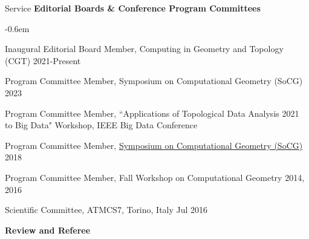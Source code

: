\documentclass{resume} %
\begin{document}
\begin{rSection}{Service}
\textbf{Editorial Boards \& Conference Program Committees}

\begin{list}{}{\leftmargin=1em}
   \itemsep -0.6em \vspace{-0.5em} %
   \item Inaugural Editorial Board Member, Computing in Geometry and Topology (CGT)  \hfill 2021-Present
\item
Program Committee Member, Symposium on Computational Geometry (SoCG) \hfill 2023
\item
Program Committee Member, ``Applications of Topological Data Analysis \hfill 2021\\
\phantom{MMM}to Big Data" Workshop, IEEE Big Data Conference
\item
Program Committee Member, \href{https://www.renyi.hu/conferences/socg18/}{Symposium on Computational Geometry (SoCG)} \hfill 2018
\item {Program Committee Member, Fall Workshop on Computational Geometry} \hfill 2014, 2016
\item
{Scientific Committee,
ATMCS7, Torino, Italy} \hfill Jul 2016\\
 \phantom{MMM}{Applied Topology: Methods, Computation, and Science}
\end{list}




\textbf{Review and Referee}


\end{rSection}
\end{document}
